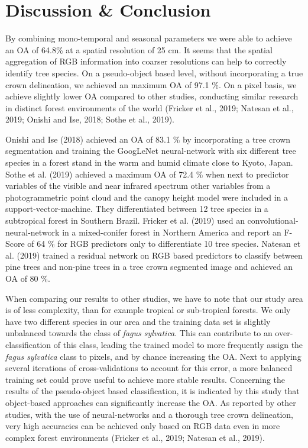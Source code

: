 \documentclass[]{article}
\begin{document}
\hypertarget{discussion-conclusion}{%
\section{Discussion \& Conclusion}\label{discussion-conclusion}}

By combining mono-temporal and seasonal parameters we were able to
achieve an OA of 64.8\% at a spatial resolution of 25 cm. It seems that
the spatial aggregation of RGB information into coarser resolutions can
help to correctly identify tree species. On a pseudo-object based level,
without incorporating a true crown delineation, we achieved an maximum
OA of 97.1 \%. On a pixel basis, we achieve slightly lower OA compared
to other studies, conducting similar research in distinct forest
environments of the world (Fricker et al., 2019; Natesan et al., 2019;
Onishi and Ise, 2018; Sothe et al., 2019).

Onishi and Ise (2018) achieved an OA of 83.1 \% by incorporating a tree
crown segmentation and training the GoogLeNet neural-network with six
different tree species in a forest stand in the warm and humid climate
close to Kyoto, Japan. Sothe et al. (2019) achieved a maximum OA of 72.4
\% when next to predictor variables of the visible and near infrared
spectrum other variables from a photogrammetric point cloud and the
canopy height model were included in a support-vector-machine. They
differentiated between 12 tree species in a subtropical forest in
Southern Brazil. Fricker et al. (2019) used an
convolutional-neural-network in a mixed-conifer forest in Northern
America and report an F-Score of 64 \% for RGB predictors only to
differentiate 10 tree species. Natesan et al. (2019) trained a residual
network on RGB based predictors to classify between pine trees and
non-pine trees in a tree crown segmented image and achieved an OA of 80
\%.

When comparing our results to other studies, we have to note that our
study area is of less complexity, than for example tropical or
sub-tropical forests. We only have two different species in our area and
the training data set is slightly unbalanced towards the class of
\emph{fagus sylvatica}. This can contribute to an over-classification of
this class, leading the trained model to more frequently assign the
\emph{fagus sylvatica} class to pixels, and by chance increasing the OA.
Next to applying several iterations of cross-validations to account for
this error, a more balanced training set could prove useful to achieve
more stable results. Concerning the results of the pseudo-object based
classification, it is indicated by this study that object-based
approaches can significantly increase the OA. As reported by other
studies, with the use of neural-networks and a thorough tree crown
delineation, very high accuracies can be achieved only based on RGB data
even in more complex forest environments (Fricker et al., 2019; Natesan
et al., 2019).
\end{document}
